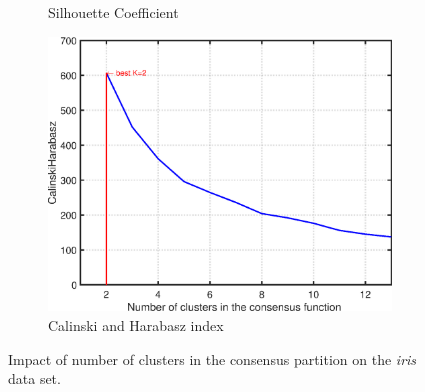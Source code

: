 \documentclass[10pt]{acmtrans2e}
\begin{document}
\begin{figure}[!bt]
\begin{subfigure}[t]{0.32\textwidth}
  \caption{Silhouette Coefficient}
  \label{fig:iris_silhouettecoefficient}
\end{subfigure}%
\hspace*{1mm}
\begin{subfigure}[t]{0.32\textwidth}
  \includegraphics[width=\textwidth]{fig/iris_u_c_std_evacluster_CH.eps}
  \caption{Calinski and Harabasz index}
  \label{fig:iris_ch}
\end{subfigure}%
\caption{Impact of number of clusters in the consensus partition on the \textit{iris} data set.}
\label{fig:kimpact} %
\end{figure}
\end{document}
